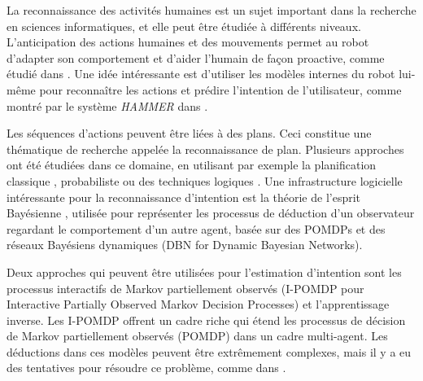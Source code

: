 \documentclass[a4paper,11pt,twoside]{StyleThese}
\begin{document}
La reconnaissance des activités humaines est un sujet important dans la recherche en sciences informatiques, et elle peut être étudiée à différents niveaux. L'anticipation des actions humaines et des mouvements permet au robot d'adapter son comportement et d'aider l'humain de façon proactive, comme étudié dans \cite{koppula2013anticipating}. Une idée intéressante est d'utiliser les modèles internes du robot lui-même pour reconnaître les actions et prédire l'intention de l'utilisateur, comme montré par le système \textit{HAMMER} dans \cite{demiris2007prediction}. 

Les séquences d'actions peuvent être liées à des plans. Ceci constitue une thématique de recherche appelée la reconnaissance de plan. Plusieurs approches ont été étudiées dans ce domaine, en utilisant par exemple la planification classique \cite{ramirez2009plan}, probabiliste \cite{bui2003general} ou des techniques logiques \cite{singla2011abductive}. Une infrastructure logicielle intéressante pour la reconnaissance d'intention est la théorie de l'esprit Bayésienne \cite{baker2014modeling}, utilisée pour représenter les processus de déduction d'un observateur regardant le comportement d'un autre agent, basée sur des POMDPs et des réseaux Bayésiens dynamiques (DBN for Dynamic Bayesian Networks).

Deux approches qui peuvent être utilisées pour l'estimation d'intention sont les processus interactifs de Markov partiellement observés (I-POMDP pour Interactive Partially Observed Markov Decision Processes) et l'apprentissage inverse. Les I-POMDP \cite{gmytrasiewicz2004interactive} offrent un cadre riche qui étend les processus de décision de Markov partiellement observés (POMDP) dans un cadre multi-agent. Les déductions dans ces modèles peuvent être extrêmement complexes, mais il y a eu des tentatives pour résoudre ce problème, comme dans \cite{doshi2009monte, hoang2013interactive}.



\end{document}

